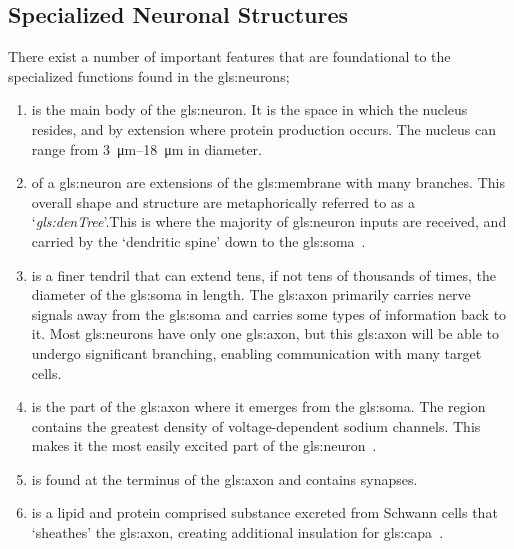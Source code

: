 \documentclass[class={myRUCProject}, crop=false]{standalone}
\begin{document}
\subsection{Specialized Neuronal Structures}
There exist a number of important features that are foundational to the specialized functions found in the \glspl{gls:neuron};
\begin{enumerate}
  \item {} is the main body of the \gls{gls:neuron}. It is the space in which the nucleus resides, and by extension where protein production occurs. The nucleus can range from \qtyrange{3}{18}{\um} in diameter.
  \item {} of a \gls{gls:neuron} are extensions of the \gls{gls:membrane} with many branches. This overall shape and structure are metaphorically referred to as a `\textit{\gls{gls:denTree}}'.\footnotemark This is where the majority of \gls{gls:neuron} inputs are received, and carried by the `dendritic spine' down to the \gls{gls:soma}~\cite{}. 
  \item {} is a finer tendril that can extend tens, if not tens of thousands of times, the diameter of the \gls{gls:soma} in length. The \gls{gls:axon} primarily carries nerve signals away from the \gls{gls:soma} and carries some types of information back to it. Most \glspl{gls:neuron} have only one \gls{gls:axon}, but this \gls{gls:axon} will be able to undergo significant branching, enabling communication with many target cells. 
  \item {} is the part of the \gls{gls:axon} where it emerges from the \gls{gls:soma}. The region contains the greatest density of voltage-dependent sodium channels. This makes it the most easily excited part of the \gls{gls:neuron}~\cite{}. 
  \item {} is found at the terminus of the \gls{gls:axon} and contains synapses. 
  \item {} is a lipid and protein comprised substance excreted from Schwann cells that `sheathes' the \gls{gls:axon}, creating additional insulation for \gls{gls:capa}~\cite{}.
\end{enumerate}
\end{document}

